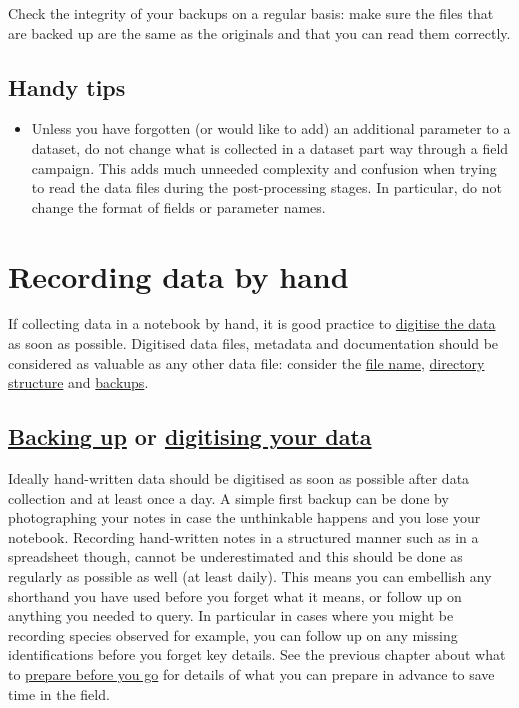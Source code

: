 \documentclass[a4paper,oneside]{report}
\providecommand{\tightlist}{%
  \setlength{\itemsep}{0pt}\setlength{\parskip}{0pt}}
\begin{document}
Check the integrity of your backups on a regular basis: make sure the
files that are backed up are the same as the originals and that you can
read them correctly.

\hypertarget{handy-tips-4}{%
\subsection{Handy tips}\label{handy-tips-4}}

\begin{itemize}
\tightlist
\item
  Unless you have forgotten (or would like to add) an additional
  parameter to a dataset, do not change what is collected in a dataset
  part way through a field campaign. This adds much unneeded complexity
  and confusion when trying to read the data files during the
  post-processing stages. In particular, do not change the format of
  fields or parameter names.
\end{itemize}

\hypertarget{recording-data-by-hand}{%
\section{Recording data by hand}\label{recording-data-by-hand}}

If collecting data in a notebook by hand, it is good practice to
\protect\hyperlink{data-backup-and-digitisation}{digitise the data} as
soon as possible. Digitised data files, metadata and documentation
should be considered as valuable as any other data file: consider the
\protect\hyperlink{file-naming}{file name},
\protect\hyperlink{directory-structure}{directory structure} and
\protect\hyperlink{backing-up-data}{backups}.

\hypertarget{backing-up-or-digitising-your-data}{%
\subsection{\texorpdfstring{\protect\hyperlink{backing-up-data}{Backing
up} or \protect\hyperlink{data-backup-and-digitisation}{digitising your
data}}{Backing up or digitising your data}}\label{backing-up-or-digitising-your-data}}

Ideally hand-written data should be digitised as soon as possible after
data collection and at least once a day. A simple first backup can be
done by photographing your notes in case the unthinkable happens and you
lose your notebook. Recording hand-written notes in a structured manner
such as in a spreadsheet though, cannot be underestimated and this
should be done as regularly as possible as well (at least daily). This
means you can embellish any shorthand you have used before you forget
what it means, or follow up on anything you needed to query. In
particular in cases where you might be recording species observed for
example, you can follow up on any missing identifications before you
forget key details. See the previous chapter about what to
\protect\hyperlink{preparing-for-data-collection-by-hand}{prepare before
you go} for details of what you can prepare in advance to save time in
the field.
\end{document}
